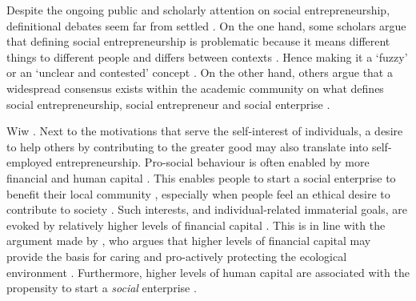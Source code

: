 \documentclass{article}
\begin{document}
  Despite the ongoing public and scholarly attention on social entrepreneurship, definitional debates seem far from settled \parencite{Saebi2019}. On the one hand, some scholars argue that defining social entrepreneurship is problematic because it means different things to different people and differs between contexts \parencite{Mair2010}. Hence making it a ‘fuzzy' \parencite{Choi2014} or an ‘unclear and contested' concept \textcite{Saebi2019}. On the other hand, others argue that a widespread consensus exists within the academic community on what defines social entrepreneurship, social entrepreneur and social enterprise \parencite{Alegre2017}. 

Wiw \parencite{Stephan2015}. Next to the motivations that serve the self-interest of individuals, a desire to help others by contributing to the greater good may also translate into self-employed entrepreneurship. Pro-social behaviour is often enabled by more financial and human capital \parencite{Korndörfer2015}. This enables people to start a social enterprise to benefit their local community \parencite{Stephan2015}, especially when people feel an ethical desire to contribute to society \textcite{Mair2006, Stirzaker2021}. Such interests, and individual-related immaterial goals, are evoked by relatively higher levels of financial capital \parencite{Inglehart1977, Kraus2012}. This is in line with the argument made by \parencite{Inglehart1977}, who argues that higher levels of financial capital may provide the basis for caring and pro-actively protecting the ecological environment \textcite{Franzen2013}. Furthermore, higher levels of human capital are associated with the propensity to start a \emph{social }enterprise \parencite{Pathak2016, Stephan2015}. 
\end{document}
